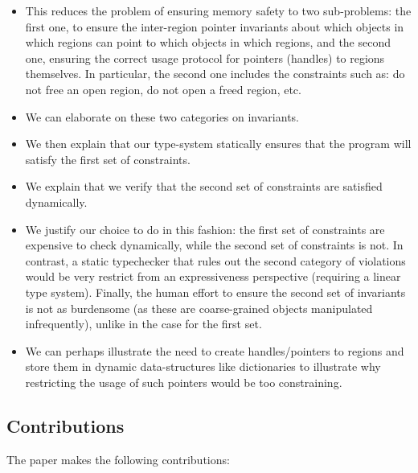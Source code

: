 \begin{itemize}

\item
This reduces the problem of ensuring memory safety to two sub-problems: the first one, to ensure the inter-region pointer invariants about which objects in which regions can point to which objects in which regions, and the second one, ensuring the correct usage protocol for pointers (handles) to regions themselves. In particular, the second one includes the constraints such as: do not free an open region, do not open a freed region, etc.

\item
We can elaborate on these two categories on invariants.

\item
We then explain that our type-system statically ensures that the program will satisfy the first set of constraints.

\item
We explain that we verify that the second set of constraints are satisfied dynamically.

\item
We justify our choice to do in this fashion: the first set of constraints are expensive to check dynamically, while the second set of constraints is not. In contrast, a static typechecker that rules out the second category of violations would be very restrict from an expressiveness perspective (requiring a linear type system). Finally, the human effort to ensure the second set of invariants is not as burdensome (as these are coarse-grained objects manipulated infrequently), unlike in the case for the first set.

\item
We can perhaps illustrate the need to create handles/pointers to regions and store them in dynamic data-structures like dictionaries to illustrate why restricting the usage of such pointers would be too constraining.

\end{itemize}

\subsection*{Contributions}

The paper makes the following contributions:

